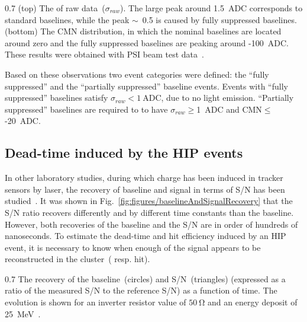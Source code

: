                  {0.7}       %
                 {(top) The \SD of raw data~($\sigma_{raw}$). The large peak around 1.5~ADC corresponds to standard baselines, while the peak $\sim$~0.5 is caused by fully suppressed baselines. (bottom) The CMN distribution, in which the nominal baselines are located around zero and the fully suppressed baselines are peaking around -100~ADC. These results were obtained with PSI beam test data~\cite{Bainbridge:2004jc}.} %

Based on these observations two event categories were defined: the ``fully suppressed'' and the ``partially suppressed'' baseline events. Events with ``fully suppressed'' baselines satisfy $\sigma_{raw}< 1~\mathrm{ADC}$, due to no light emission. ``Partially suppressed'' baselines are required to to have $\sigma_{raw}\geq$1~ADC and CMN$\leq$-20~ADC.

\subsection{Dead-time induced by the HIP events~\label{sec:deadtimePast}}

In other laboratory studies, during which charge has been induced in tracker sensors by laser, the recovery of baseline and signal in terms of S/N has been studied~\cite{Adam:2005pz}. It was shown in Fig.~\ref{fig:figures/baselineAndSignalRecovery} that the S/N ratio recovers differently and by different time constants than the baseline. However, both recoveries of the baseline and the S/N are in order of hundreds of nanoseconds. To estimate the dead-time and hit efficiency induced by an HIP event, it is necessary to know when enough of the signal appears to be reconstructed in the cluster~( resp. hit).

                 {0.7}       %
                 {The recovery of the baseline~(circles) and S/N~(triangles) (expressed as a ratio of the measured S/N to the reference S/N) as a function of time. The evolution is shown for an inverter resistor value of $50~\mathrm{\Omega}$ and an energy deposit of 25~MeV~\cite{Adam:2005pz}.} %

